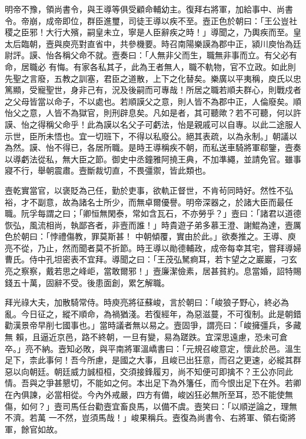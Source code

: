 \begin{pinyinscope}
 明帝不豫，領尚書令，與王導等俱受顧命輔幼主。復拜右將軍，加給事中、尚書令。帝崩，成帝即位，群臣進璽，司徒王導以疾不至。壼正色於朝曰：「王公豈社稷之臣邪！大行大殯，嗣皇未立，寧是人臣辭疾之時！」導聞之，乃輿疾而至。皇太后臨朝，壼與庾亮對直省中，共參機要。時召南陽樂謨為郡中正，潁川庾怡為廷尉評。謨、怡各稱父命不就。壼奏曰：「人無非父而生，職無非事而立。有父必有命，居職必
 有悔。有家各私其子，此為王者無人，職不軌物，官不立政。如此則先聖之言廢，五教之訓塞，君臣之道散，上下之化替矣。樂廣以平夷稱，庾氏以忠篤顯，受寵聖世，身非己有，況及後嗣而可專哉！所居之職若順夫群心，則戰戍者之父母皆當以命子，不以處也。若順謨父之意，則人皆不為郡中正，人倫廢矣。順怡父之意，人皆不為獄官，則刑辟息矣。凡如是者，其可聽歟？若不可聽，何以許謨、怡之得稱父命乎！此為謨以名父子可虧法，怡是親戚可以自專。以此二途服人示世，臣所未悟也。宜一切班下，不得以私廢公。絕其表疏，以為永制。」朝議以
 為然。謨、怡不得已，各居所職。是時王導稱疾不朝，而私送車騎將軍郗鑒，壼奏以導虧法從私，無大臣之節。御史中丞鐘雅阿撓王典，不加準繩，並請免官。雖事寢不行，舉朝震肅。壼斷裁切直，不畏彊禦，皆此類也。



 壼乾實當官，以褒貶為己任，勤於吏事，欲軌正督世，不肯茍同時好。然性不弘裕，才不副意，故為諸名士所少，而無卓爾優譽。明帝深器之，於諸大臣而最任職。阮孚每謂之曰；「卿恒無閑泰，常如含瓦石，不亦勞乎？」壼曰：「諸君以道德恢弘，風流相尚，執鄙吝者，非壼而誰！」時貴遊子弟多慕王澄、謝鯤為達，壼厲色於朝曰：「悖禮傷教，罪莫斯甚！
 中朝傾覆，實由於此。」欲奏推之。王導、庾亮不從，乃止，然而聞者莫不折節。時王導以勛德輔政，成帝每幸其宅，嘗拜導婦曹氏。侍中孔坦密表不宜拜。導聞之曰：「王茂弘駑痾耳，若卞望之之巖巖，刁玄亮之察察，戴若思之峰岠，當敢爾邪！」壼廉潔儉素，居甚貧約。息當婚，詔特賜錢五十萬，固辭不受。後患面創，累乞解職。



 拜光祿大夫，加散騎常侍。時庾亮將征蘇峻，言於朝曰：「峻狼子野心，終必為亂。今日征之，縱不順命，為禍猶淺。若復經年，為惡滋蔓，不可復制。此是朝錯勸漢景帝早削七國事也。」當時議者無以易之。壼固爭，謂亮曰：「峻擁彊兵，多藏無
 賴，且逼近京邑，路不終朝，一旦有變，易為蹉跌。宜深思遠慮，恐未可倉卒。」亮不納。壼知必敗，與平南將軍溫嶠書曰：「元規召峻意定，懷此於邑。溫生足下，柰此事何！吾今所慮，是國之大事，且峻已出狂意，而召之更速，必縱其群惡以向朝廷。朝廷威力誠桓桓，交須接鋒履刃，尚不知便可即擒不？王公亦同此情。吾與之爭甚懇切，不能如之何。本出足下為外籓任，而今恨出足下在外。若卿在內俱諫，必當相從。今內外戒嚴，四方有備，峻凶狂必無所至耳，恐不能使無傷，如何？」壼司馬任台勸壼宜畜良馬，以備不虞。壼笑曰：「以順逆論之，理無不濟。若萬
 一不然，豈須馬哉！」峻果稱兵。壼復為尚書令、右將軍、領右衛將軍，餘官如故。




\end{pinyinscope}
